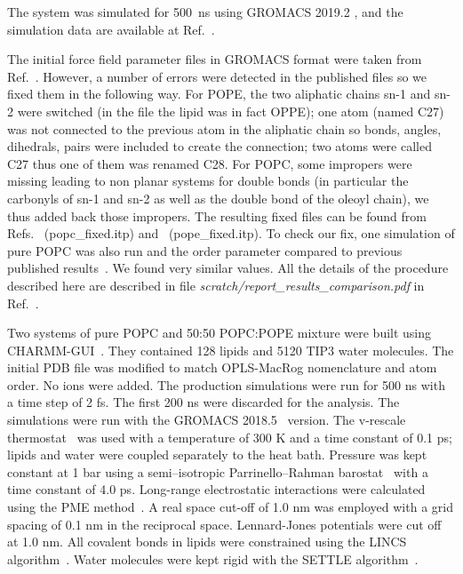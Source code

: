 \documentclass[journal=jpcbfk]{achemso}
\begin{document}
The system was simulated for 500~ns using GROMACS 2019.2 \cite{abraham2015gromacs}, and the simulation data are available at Ref.~.


 The initial force field parameter files in GROMACS format were taken from Ref.~. 
However, a number of errors were detected in the published files so we fixed them in the following way. 
For POPE, the two aliphatic chains sn-1 and sn-2 were switched (in the file the lipid was in fact OPPE); 
one atom (named C27) was not connected to the previous atom in the aliphatic chain so bonds, angles, dihedrals, 
pairs were included to create the connection; two atoms were called C27 thus one of them was renamed C28. 
For POPC, some impropers were missing leading to non planar systems for double bonds 
(in particular the carbonyls of sn-1 and sn-2 as well as the double bond of the oleoyl chain), 
we thus added back those impropers. The resulting fixed files can be found from Refs.~ (popc\_fixed.itp) and~ (pope\_fixed.itp). 
To check our fix, one simulation of pure POPC was also run and the order parameter compared to previous published results~\cite{botan15}. We found very similar values.
All the details of the procedure described here are described 
in file {\it scratch/report\_results\_comparison.pdf} in Ref.~.

Two systems of pure POPC and 50:50 POPC:POPE mixture were built using CHARMM-GUI~\cite{lee16}. They contained 128 lipids and 5120 TIP3 water molecules. The initial PDB file was modified to match OPLS-MacRog nomenclature and atom order. No ions were added. The production simulations were run for 500 ns with a time step of 2 fs. The first 200 ns were discarded for the analysis. The simulations were run with the GROMACS 2018.5~\cite{abraham2015gromacs} version. The v-rescale thermostat~\cite{bussi07} was used with a temperature of 300 K and a time constant of 0.1 ps; lipids and water were coupled separately to the heat bath. Pressure was kept constant at 1 bar using a semi–isotropic Parrinello–Rahman barostat~\cite{parrinello81} with a time constant of 4.0 ps. Long-range electrostatic interactions were calculated using the PME method~\cite{darden93,essman95}. A real space cut-off of 1.0 nm was employed with a grid spacing of 0.1 nm in the reciprocal space. Lennard-Jones potentials were cut off at 1.0 nm. All covalent bonds in lipids were constrained using the LINCS algorithm~\cite{hess07,hess97}. Water molecules were kept rigid with the SETTLE algorithm~\cite{miyamoto92}.
\end{document}
